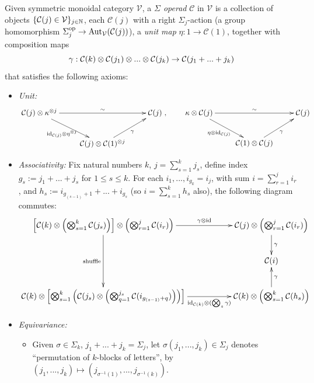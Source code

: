 \documentclass{article}
\begin{document}
\begin{defn}\label{defn_operad}
Given symmetric monoidal category $\mathcal{V}$, a \emph{$\Sigma$ operad} $\mathcal{C}$ in $\mathcal{V}$ is a collection of objects $\{\mathcal{C}(j)\in\mathcal{V}\}_{j\in\mathbb{N}}$, each $\mathcal{C}(j)$ with a right $\Sigma_j$-action (a group homomorphism $\Sigma_j^{\mathrm{op}}\rightarrow \mathrm{Aut}_\mathcal{V}(\mathcal{C}(j))$), a \emph{unit map} $\eta:1\rightarrow \mathcal{C}(1)$, together with composition maps
\[\gamma:\mathcal{C}(k)\otimes \mathcal{C}(j_1)\otimes...\otimes \mathcal{C}(j_k)\rightarrow \mathcal{C}(j_1+...+j_k)\]
that satisfies the following axioms:
\begin{itemize}
    \item \emph{Unit:}
    \[\xymatrix{
        \mathcal{C}(j)\tensor \kappa^{\tensor j} \ar[dr]_-{\id_{\mathcal{C}(j)}\tensor \eta^{\tensor j}} \ar[rr]^-{\sim} && \mathcal{C}(j)\\
        & \mathcal{C}(j)\tensor \mathcal{C}(1)^{\tensor j} \ar[ur]_-{\gamma}
    },\quad\quad \xymatrix{
        \kappa\tensor \mathcal{C}(j) \ar[dr]_-{\eta\tensor \id_{\mathcal{C}(j)}} \ar[rr]^-{\sim} && \mathcal{C}(j)\\
        & \mathcal{C}(1)\tensor \mathcal{C}(j) \ar[ur]_-{\gamma}
    }\]
    \item \emph{Associativity:} Fix natural numbers $k$, $j = \sum_{s=1}^k j_s$, define index $g_s:= j_1+...+j_s$ for $1\leq s\leq k$. For each $i_1,...,i_{g_k}=i_j$, with sum $i=\sum_{r=1}^j i_r$, and $h_s:= i_{g_{(s-1)}+1}+...+i_{g_s}$ (so $i=\sum_{s=1}^k h_s$ also), the following diagram commutes:
    \[\xymatrix{
        \left[\mathcal{C}(k)\tensor \left(\bigtensor_{s=1}^k \mathcal{C}(j_s)\right)\right]\tensor \left(\bigtensor_{r=1}^j \mathcal{C}(i_r)\right) \ar[dd]_-{\text{shuffle}} \ar[rr]^-{\gamma\tensor \id} && \mathcal{C}(j) \tensor \left(\bigtensor_{r=1}^j \mathcal{C}(i_r)\right) \ar[d]^-{\gamma}\\
        && \mathcal{C}(i)\\
        \mathcal{C}(k) \tensor \left[\bigtensor_{s=1}^k \left(\mathcal{C}(j_s)\tensor \left(\bigtensor_{q=1}^{j_s} \mathcal{C}(i_{g_{(s-1)}+q})\right)\right)\right] \ar[rr]_-{\id_{\mathcal{C}(k)} \tensor (\bigtensor_s \gamma)} && \mathcal{C}(k)\tensor \left(\bigtensor_{s=1}^k \mathcal{C}(h_s)\right) \ar[u]_-{\gamma}
    }\]
    \item \emph{Equivariance:}
    \begin{itemize}
        \item Given $\sigma\in\Sigma_k$, $j_1+...+j_k = \Sigma_j$, let $\sigma(j_1,...,j_k)\in\Sigma_j$ denotes ``permutation of $k$-blocks of letters'', by $(j_1,...,j_k)\mapsto (j_{\sigma^{-1}(1)},...,j_{\sigma^{-1}(k)})$.

\end{itemize}
\end{itemize}
\end{defn}
\end{document}
